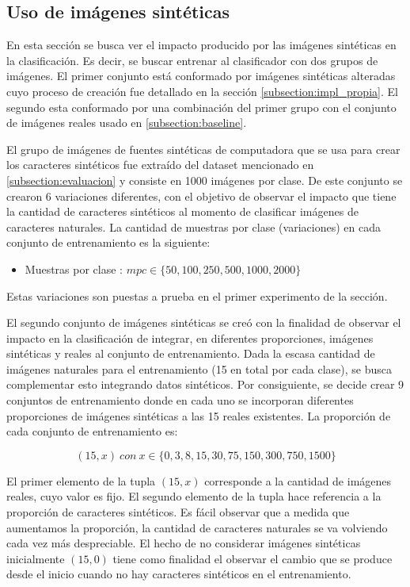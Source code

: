\subsection{Uso de imágenes sintéticas}

	En esta sección se busca ver el impacto producido por las imágenes sintéticas en la clasificación. Es decir, se buscar entrenar al clasificador con dos grupos de imágenes. El primer conjunto está conformado por imágenes sintéticas alteradas cuyo proceso de creación fue detallado en la sección \ref{subsection:impl_propia}. El segundo esta conformado por una combinación del primer grupo con el conjunto de imágenes reales usado en \ref{subsection:baseline}.
	
	El grupo de imágenes de fuentes sintéticas de computadora que se usa para crear los caracteres sintéticos fue extraído del dataset mencionado en \ref{subsection:evaluacion} y consiste en 1000 imágenes por clase. De este conjunto se crearon 6 variaciones diferentes, con el objetivo de observar el impacto que tiene la cantidad de caracteres sintéticos al momento de clasificar imágenes de caracteres naturales. La cantidad de muestras por clase (variaciones) en cada conjunto de entrenamiento es la siguiente:
	\begin{itemize}
		\item Muestras por clase : $ mpc \in \{ 50,100,250,500,1000,2000\}$
	\end{itemize}
	
	Estas variaciones son puestas a prueba en el primer experimento de la sección.
	
	El segundo conjunto de imágenes sintéticas se creó con la finalidad de observar el impacto en la clasificación de integrar, en diferentes proporciones, imágenes sintéticas y reales al conjunto de entrenamiento. Dada la escasa cantidad de imágenes naturales para el entrenamiento (15 en total por cada clase), se busca complementar esto integrando datos sintéticos. Por consiguiente, se decide crear 9 conjuntos de entrenamiento donde en cada uno se incorporan diferentes proporciones de imágenes sintéticas a las 15 reales existentes. La proporción de cada conjunto de entrenamiento es: 
	
	$$(15, x)~\textit{con}~ x \in \{0,3,8,15,30,75,150,300,750,1500 \}$$
	
	El primer elemento de la tupla $(15, x)$ corresponde a la cantidad de imágenes reales, cuyo valor es fijo. El segundo elemento de la tupla hace referencia a la proporción de caracteres sintéticos. Es fácil observar que a medida que aumentamos la proporción, la cantidad de caracteres naturales se va volviendo cada vez más despreciable. El hecho de no considerar imágenes sintéticas inicialmente $(15,0)$ tiene como finalidad el observar el cambio que se produce desde el inicio cuando no hay caracteres sintéticos en el entrenamiento.
	
